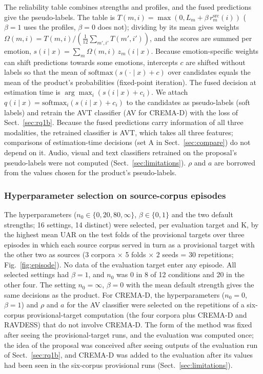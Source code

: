The reliability table combines strengths and profiles, and the fused predictions give the pseudo-labels. The table is $T(m,i)=\max(0,L_m+\beta\,r^{\mathrm{src}}_m(i))$ ($\beta=1$ uses the profiles, $\beta=0$ does not); dividing by its mean gives weights $\Omega(m,i)=T(m,i)/(\frac{1}{12}\sum_{m',i'}T(m',i'))$, and the scores are summed per emotion, $s(i\mid x)=\sum_m \Omega(m,i)\,z_m(i\mid x)$. Because emotion-specific weights can shift predictions towards some emotions, intercepts $c$ are shifted without labels so that the mean of $\mathrm{softmax}(s(\cdot\mid x)+c)$ over candidates equals the mean of the product's probabilities (fixed-point iteration). The fused decision at estimation time is $\arg\max_i(s(i\mid x)+c_i)$. We attach $q(i\mid x)=\mathrm{softmax}_i(s(i\mid x)+c_i)$ to the candidates as pseudo-labels (soft labels) and retrain the AVT classifier (AV for CREMA-D) with the loss of Sect.~\ref{sec:rq1b}. Because the fused predictions carry information of all three modalities, the retrained classifier is AVT, which takes all three features; comparisons of estimation-time decisions (set A in Sect.~\ref{sec:compare}) do not depend on it. Audio, visual and text classifiers retrained on the proposal's pseudo-labels were not computed (Sect.~\ref{sec:limitations}). $\rho$ and $a$ are borrowed from the values chosen for the product's pseudo-labels.

\subsubsection{Hyperparameter selection on source-corpus episodes}\label{sec:hp}
The hyperparameters ($n_0\in\{0,20,80,\infty\}$, $\beta\in\{0,1\}$ and the two default strengths; 16 settings, 14 distinct) were selected, per evaluation target and K, by the highest mean UAR on the test folds of the provisional targets over three episodes in which each source corpus served in turn as a provisional target with the other two as sources (3 corpora $\times$ 5 folds $\times$ 2 seeds = 30 repetitions; Fig.~\ref{fig:episode}). No data of the evaluation target enter any episode. All selected settings had $\beta=1$, and $n_0$ was 0 in 8 of 12 conditions and 20 in the other four. The setting $n_0=\infty$, $\beta=0$ with the mean default strength gives the same decisions as the product. For CREMA-D, the hyperparameters ($n_0=0$, $\beta=1$) and $\rho$ and $a$ for the AV classifier were selected on the repetitions of a six-corpus provisional-target computation (the four corpora plus CREMA-D and RAVDESS) that do not involve CREMA-D. The form of the method was fixed after seeing the provisional-target runs, and the evaluation was computed once; the idea of the proposal was conceived after seeing outputs of the evaluation run of Sect.~\ref{sec:rq1b}, and CREMA-D was added to the evaluation after its values had been seen in the six-corpus provisional runs (Sect.~\ref{sec:limitations}).

